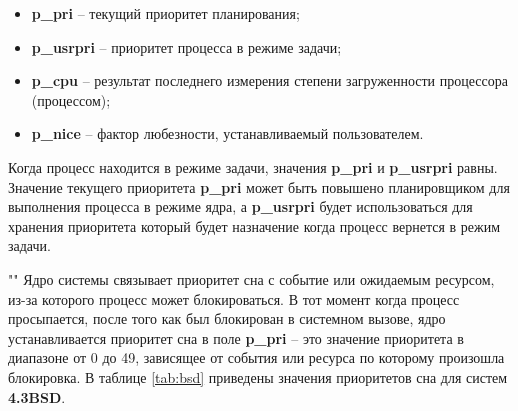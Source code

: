 \begin{itemize}
    \item \textbf{p\_pri} -- текущий приоритет планирования;
    \item \textbf{p\_usrpri} -- приоритет процесса в режиме задачи;
    \item \textbf{p\_cpu} -- результат последнего измерения степени загруженности процессора (процессом);
    \item \textbf{p\_nice} -- фактор любезности, устанавливаемый пользователем.
\end{itemize}

\noindent Когда процесс находится в режиме задачи, значения \textbf{p\_pri} и \textbf{p\_usrpri} равны. Значение текущего приоритета \textbf{p\_pri} может быть повышено планировщиком для выполнения процесса в режиме ядра, а \textbf{p\_usrpri} будет использоваться для хранения приоритета который будет назначение когда процесс вернется в режим задачи.

""\newline 
\noindent Ядро системы связывает приоритет сна с событие или ожидаемым ресурсом, из-за которого процесс может блокироваться. В тот момент когда процесс просыпается, после того как был блокирован в системном вызове, ядро устанавливается приоритет сна в поле \textbf{p\_pri} -- это значение приоритета в диапазоне от 0 до 49, зависящее от события или ресурса по которому произошла блокировка. В таблице \ref{tab:bsd} приведены значения приоритетов сна для систем \textbf{4.3BSD}.


